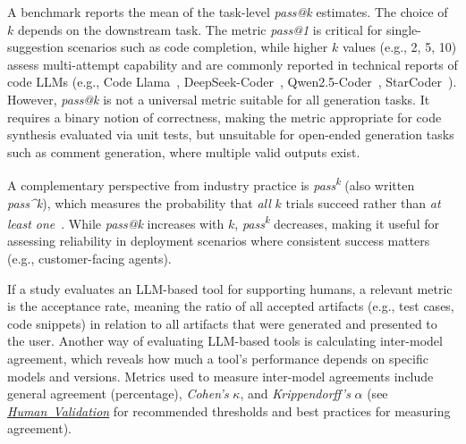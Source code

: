 \documentclass[smallextended]{svjour3}
\newcommand{\humanvalidation}{\hyperref[sec:use-human-validation-for-llm-outputs]{\mbox{\emph{Human Validation}}}\xspace}
\newcommand{\humanvalidation}{\href{/guidelines/human-validation/}{\emph{Human Validation}}\xspace}
\begin{document}
A benchmark reports the mean of the task-level \emph{pass@k} estimates.
The choice of $k$ depends on the downstream task. The metric \emph{pass@1} is critical for single-suggestion scenarios such as code completion, while higher $k$ values (e.g., 2, 5, 10) assess multi-attempt capability and are commonly reported in technical reports of code LLMs (e.g., Code Llama~\cite{DBLP:journals/corr/abs-2308-12950}, DeepSeek-Coder~\cite{DBLP:journals/corr/abs-2401-14196}, Qwen2.5-Coder~\cite{DBLP:journals/corr/abs-2409-12186}, StarCoder~\cite{DBLP:journals/tmlr/LiAZMKMMALCLZZW23}).
However, \emph{pass@k} is not a universal metric suitable for all generation tasks.
It requires a binary notion of correctness, making the metric appropriate for code synthesis evaluated via unit tests, but unsuitable for open-ended generation tasks such as comment generation, where multiple valid outputs exist.

A complementary perspective from industry practice is \emph{pass\textsuperscript{k}} (also written \emph{pass\^{}k}), which measures the probability that \emph{all} $k$ trials succeed rather than \emph{at least one}~\cite{Anthropic2025evals}. While \emph{pass@k} increases with $k$, \emph{pass\textsuperscript{k}} decreases, making it useful for assessing reliability in deployment scenarios where consistent success matters (e.g., customer-facing agents).

If a study evaluates an LLM-based tool for supporting humans, a relevant metric is the acceptance rate, meaning the ratio of all accepted artifacts (e.g., test cases, code snippets) in relation to all artifacts that were generated and presented to the user.
Another way of evaluating LLM-based tools is calculating inter-model agreement, which reveals how much a tool's performance depends on specific models and versions.
Metrics used to measure inter-model agreements include general agreement (percentage), \emph{Cohen's} $\kappa$, and \emph{Krippendorff's} $\alpha$ (see \humanvalidation for recommended thresholds and best practices for measuring agreement).
\end{document}
